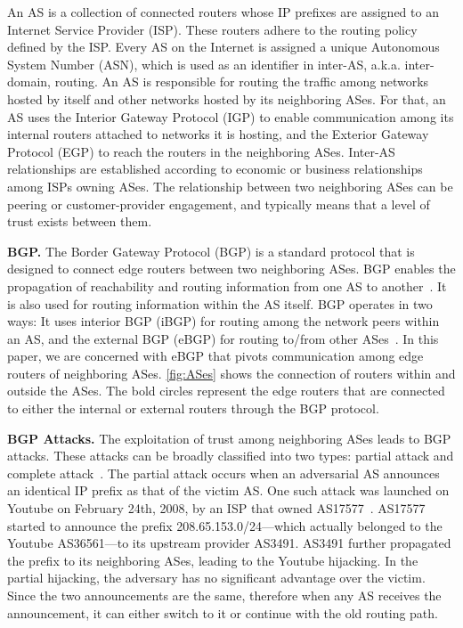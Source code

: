 \documentclass[5p]{elsarticle}
\newcommand{\BfPara}[1]{{\noindent\bf#1.}\xspace}
\begin{document}
An AS is a collection of connected routers whose IP prefixes are assigned to an Internet Service Provider (ISP). These routers adhere to the routing policy defined by the ISP. Every AS on the Internet is assigned a unique Autonomous System Number (ASN), which is used as an identifier in inter-AS, a.k.a. inter-domain, routing. An AS is responsible for routing the traffic among networks hosted by itself and other networks hosted by its neighboring ASes. For that, an AS uses the Interior Gateway Protocol (IGP) to enable communication among its internal routers attached to networks it is hosting, and the Exterior Gateway Protocol (EGP) to reach the routers in the neighboring ASes. Inter-AS relationships are established according to economic or business relationships among ISPs owning ASes. The relationship between two neighboring ASes can be peering or customer-provider engagement, and typically means that a level of trust exists between them.  


\BfPara{BGP}
The Border Gateway Protocol (BGP) is a standard protocol that is designed to connect edge routers between two neighboring ASes. BGP enables the propagation of reachability and routing information from one AS to another~\cite{rfc4271}. It is also used for routing information within the AS itself. BGP operates in two ways: It uses interior BGP (iBGP) for routing among the network peers within an AS, and the external BGP (eBGP) for routing to/from other ASes~\cite{rfc4271,SmithG96}. In this paper, we are concerned with eBGP that pivots communication among edge routers of neighboring ASes. \autoref{fig:ASes} shows the connection of routers within and outside the ASes. The bold circles represent the edge routers that are connected to either the internal or external routers through the BGP protocol. %

\BfPara{BGP Attacks}\label{bgp:attacks}
The exploitation of trust among neighboring ASes leads to BGP attacks. These attacks can be broadly classified into two types: partial attack and complete attack~\cite{BGPHijack}. The partial attack occurs when an adversarial AS announces an identical IP prefix as that of the victim AS. One such attack was launched on Youtube on February 24th, 2008, by an ISP that owned AS17577~\cite{BiersackJFFTTTV12,WongS11}. AS17577 started to announce the prefix 208.65.153.0/24---which actually belonged to the Youtube AS36561---to its upstream provider AS3491. AS3491 further propagated the prefix to its neighboring ASes, leading to the Youtube hijacking. In the partial hijacking, the adversary has no significant advantage over the victim. Since the two announcements are the same, therefore when any AS receives the announcement, it can either switch to it or continue with the old routing path. 
\end{document}
